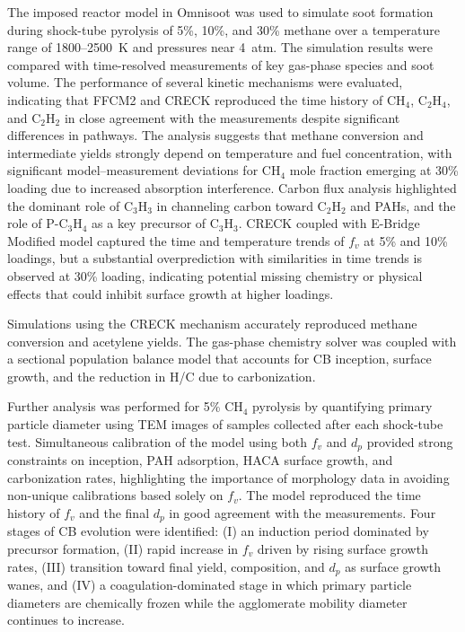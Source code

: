 The imposed reactor model in Omnisoot was used to simulate soot formation during shock-tube pyrolysis of 5\%, 10\%, and 30\% methane over a temperature range of 1800–2500~K and pressures near 4~atm. The simulation results were compared with time-resolved measurements of key gas-phase species and soot volume. The performance of several kinetic mechanisms were evaluated, indicating that FFCM2 and CRECK reproduced the time history of CH$_4$, C$_2$H$_4$, and C$_2$H$_2$ in close agreement with the measurements despite significant differences in pathways. The analysis suggests that methane conversion and intermediate yields strongly depend on temperature and fuel concentration, with significant model–measurement deviations for CH$_4$ mole fraction emerging at 30\% loading due to increased absorption interference. Carbon flux analysis highlighted the dominant role of C$_3$H$_3$ in channeling carbon toward C$_2$H$_2$ and PAHs, and the role of P-C$_3$H$_4$ as a key precursor of C$_3$H$_3$. CRECK coupled with E-Bridge Modified model captured the time and temperature trends of $f_v$ at 5\% and 10\% loadings, but a substantial overprediction with similarities in time trends is observed at 30\% loading, indicating potential missing chemistry or physical effects that could inhibit surface growth at higher loadings.



Simulations using the CRECK mechanism accurately reproduced methane conversion and acetylene yields. The gas-phase chemistry  solver was coupled with a sectional population balance model that accounts for CB inception, surface growth, and the reduction in H/C due to carbonization.

Further analysis was performed for 5\% CH$_4$ pyrolysis by quantifying primary particle diameter using TEM images of samples collected after each shock-tube test. Simultaneous calibration of the model using both $f_v$ and $d_p$ provided strong constraints on inception, PAH adsorption, HACA surface growth, and carbonization rates, highlighting the importance of morphology data in avoiding non-unique calibrations based solely on $f_v$. The model reproduced the time history of $f_v$ and the final $d_p$ in good agreement with the measurements. Four stages of CB evolution were identified: (I) an induction period dominated by precursor formation, (II) rapid increase in $f_v$ driven by rising surface growth rates, (III) transition toward final yield, composition, and $d_p$ as surface growth wanes, and (IV) a coagulation-dominated stage in which primary particle diameters are chemically frozen while the agglomerate mobility diameter continues to increase.

